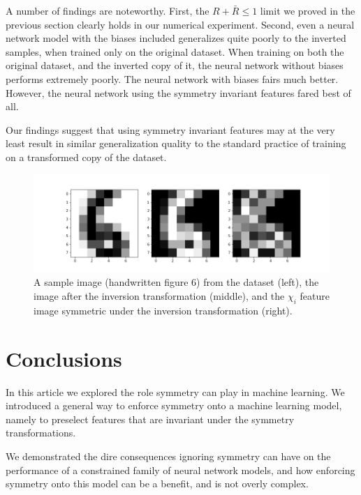 \documentclass[twocolumn, prl, nofootinbib]{revtex4-1}
\begin{document}
A number of findings are noteworthy. First, the $R + \bar{R} \leq 1$ limit we proved in the previous section clearly holds in our numerical experiment. Second, even a neural network model with the biases included generalizes quite poorly to the inverted samples, when trained only on the original dataset. When training on both the original dataset, and the inverted copy of it, the neural network without biases performs extremely poorly. The neural network with biases fairs much better. However, the neural network using the symmetry invariant features fared best of all.

Our findings suggest that using symmetry invariant features may at the very least result in similar generalization quality to the standard practice of training on a transformed copy of the dataset.

\begin{figure}
\centering
\includegraphics[width=1.0\linewidth]{images/six_cubed}
\caption{A sample image (handwritten figure 6) from the dataset (left), the image after the inversion transformation (middle), and the $\chi_i$ feature image symmetric under the inversion transformation (right).}
\label{fig:six_cubed}
\end{figure}





\section{Conclusions}
\label{Sec:conclusions}

In this article we explored the role symmetry can play in machine learning. We introduced a general way to enforce symmetry onto a machine learning model, namely to preselect features that are invariant under the symmetry transformations.

We demonstrated the dire consequences ignoring symmetry can have on the performance of a constrained family of neural network models, and how enforcing symmetry onto this model can be a benefit, and is not overly complex.
\end{document}
